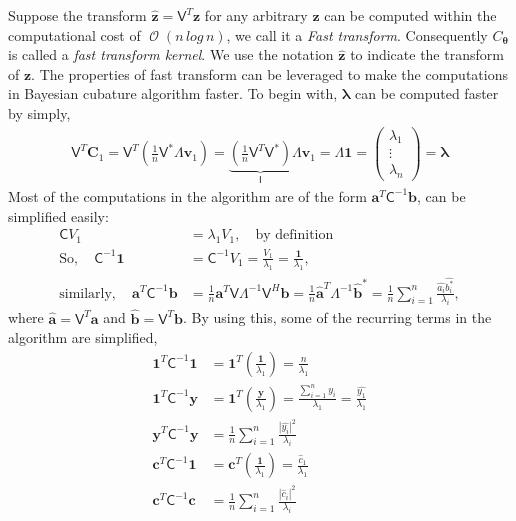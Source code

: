 \documentclass[smallextended]{svjour3}       %
\DeclareMathOperator{\Order}{{\mathcal O}}
\newcommand{\bm}[1]{\boldsymbol{#1}}
\newcommand{\vlambda}{{\bm{\lambda}}}
\newcommand{\vtheta}{{\bm{\theta}}}
\newcommand{\va}{\bm{a}}
\newcommand{\vb}{\bm{b}}
\newcommand{\vc}{\bm{c}}
\newcommand{\vC}{\bm{C}}
\newcommand{\vv}{\bm{v}}
\newcommand{\vy}{\bm{y}}
\newcommand{\vz}{\bm{z}}
\newcommand{\vone}{\bm{1}}
\newcommand{\mC}{\mathsf{C}}
\newcommand{\mCInv}{{\mathsf{C}^{-1}}}
\newcommand{\mLambda}{\mathsf{\Lambda}}
\newcommand{\mLambdaInv}{\mathsf{\Lambda}^{-1}}
\newcommand{\mV}{\mathsf{V}}
\def\abs#1{\ensuremath{\left \lvert #1 \right \rvert}}
\begin{document}
Suppose the transform $\hat{\vz} = \mV^T \vz$ for any arbitrary $\vz$ can be computed within the computational cost of $\Order( n \, log\, n)$, we call it a \emph{Fast transform}. Consequently $C_{\vtheta}$ is called a \emph{fast transform kernel}.
We use the notation $\hat{\vz}$ to indicate the transform of $\vz$.
The properties of fast transform can be leveraged to make the computations in Bayesian cubature algorithm faster. To begin with, $\vlambda$ can be computed faster by simply,
\begin{align}
\label{eqn:fast_trasnform_to_eigvalues}
\mV^T \vC_1 = \mV^T \left( \frac 1n \mV^* \mLambda \vv_1 \right) =
\underbrace{\left( \frac 1n \mV^T  \mV^* \right) }_{\mathsf{I}} \mLambda \vv_1  =  \mLambda \vone =
\begin{pmatrix}
\lambda_1 \\ \vdots \\ \lambda_n
\end{pmatrix} = \vlambda
\end{align}
Most of the computations in the algorithm are of the form $\va^T\mCInv\vb$, can be simplified easily:
\begin{align*}
\mC V_1 &= \lambda_1 V_1 , \quad \text{by definition}
\\
\text{So}, \quad
\mCInv \vone &= \mCInv V_1 = \frac{V_1}{\lambda_1} = \frac{\vone}{\lambda_1} , 
\\
\text{similarly}, \quad \va^T\mCInv\vb &= \frac 1n \va^T \mV \mLambdaInv \mV^H \vb
= \frac 1n \widehat{\va}^T\mLambdaInv \widehat{\vb}^*
= \frac 1n \sum_{i=1}^n \frac{\widehat{a_i} \widehat{b_i^*}}{\lambda_i},
\end{align*}
where $\widehat{\va} = \mV^T \va$ and $\widehat{\vb} = \mV^T \vb$. By using this, some of the recurring terms in the algorithm are simplified,
\begin{align*}
\vone^T\mCInv\vone &= \vone^T \left(\frac{\vone}{\lambda_1}\right) = \frac{n}{\lambda_1}
\\
\vone^T\mCInv\vy &= \vone^T \left( \frac{\vy}{\lambda_1} \right) = \frac{\sum_{i=1}^n y_i}{\lambda_1} = \frac{\widehat{y_1}}{\lambda_1}
\\
\vy^T\mCInv \vy &= \frac 1n \sum_{i=1}^n \frac{\abs{\widehat{y_i}}^2}{\lambda_i}
\\
\vc^T\mCInv \vone &= \vc^T \left(\frac{ \vone }{\lambda_1} \right) = \frac{\widehat{c}_1}{\lambda_1}
\\
\vc^T\mCInv \vc &= \frac 1n \sum_{i=1}^n \frac{\abs{\widehat{c}_i}^2}{\lambda_i}
\end{align*}
\end{document}
